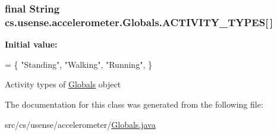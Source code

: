 \subsubsection[{A\+C\+T\+I\+V\+I\+T\+Y\+\_\+\+T\+Y\+P\+E\+S}]{\setlength{\rightskip}{0pt plus 5cm}final String cs.\+usense.\+accelerometer.\+Globals.\+A\+C\+T\+I\+V\+I\+T\+Y\+\_\+\+T\+Y\+P\+E\+S\mbox{[}$\,$\mbox{]}\hspace{0.3cm}{\ttfamily [static]}}\label{classcs_1_1usense_1_1accelerometer_1_1_globals_a95684c30d5b4ba3d97e87d6967560fa0}
{\bfseries Initial value\+:}
\begin{DoxyCode}
= \{
        \textcolor{stringliteral}{"Standing"}, \textcolor{stringliteral}{"Walking"}, \textcolor{stringliteral}{"Running"}, 
    \}
\end{DoxyCode}
Activity types of \hyperlink{classcs_1_1usense_1_1accelerometer_1_1_globals}{Globals} object 

The documentation for this class was generated from the following file\+:\begin{DoxyCompactItemize}
\item 
src/cs/usense/accelerometer/\hyperlink{_globals_8java}{Globals.\+java}\end{DoxyCompactItemize}
